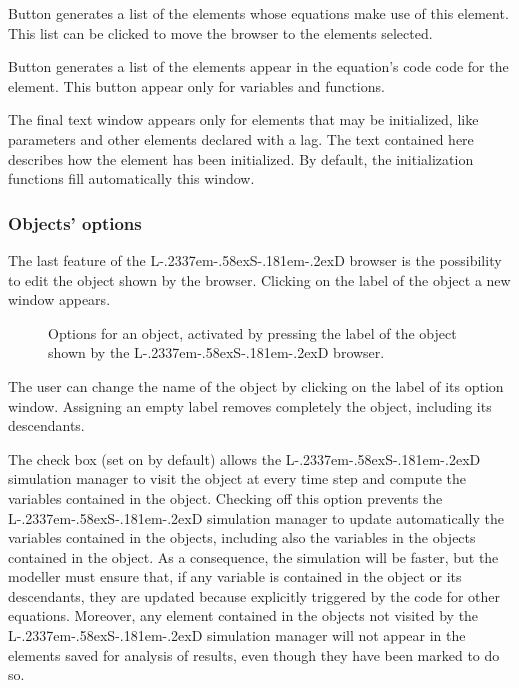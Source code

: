 \documentclass [11pt,a4paper] {book}
\def\LsD{{L\kern-.2337em\lower-.58ex\hbox{S}\kern-.181em\lower-.2ex\hbox{D}}\xspace}
\begin{document}
Button  generates a list of the elements whose equations make use of this element. This list can be clicked to move the browser to the elements selected.


Button  generates a list of the elements appear in the equation's code code for the element. This button appear only for variables and functions.

The final text window appears only for elements that may be initialized, like parameters and other elements declared with a lag. The text contained here describes how the element has been initialized. By default, the initialization functions fill automatically this window.


\subsubsection{Objects' options}
The last feature of the \LsD browser is the possibility to edit the object shown by the browser. Clicking on the label of the object a new window appears.

\begin{figure}[ht]
  \centering
  \caption{Options for an object, activated by pressing the label of the object shown by the \LsD browser.}
  \label{fig:obj_opt}
\end{figure}

The user can change the name of the object by clicking on the label of its option window. Assigning an empty label removes completely the object, including its descendants.

The check box  (set on by default) allows the \LsD simulation manager to visit the object at every time step and compute the variables contained in the object. Checking off this option prevents the \LsD simulation manager to update automatically the variables contained in the objects, including also the variables in the objects contained in the object. As a consequence, the simulation will be faster, but the modeller must ensure that, if any variable is contained in the object or its descendants, they are updated because explicitly triggered by the code for other equations. Moreover, any element contained in the objects not visited by the \LsD simulation manager will not appear in the elements saved for analysis of results, even though they have been marked to do so.
\end{document}
